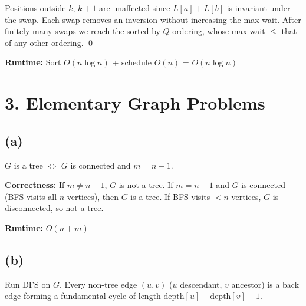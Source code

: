 \documentclass[11pt]{article}
\begin{document}
Positions outside $k$, $k{+}1$ are unaffected since $L[a] + L[b]$ is invariant under the swap. Each swap removes an inversion without increasing the max wait. After finitely many swaps we reach the sorted-by-$Q$ ordering, whose max wait $\le$ that of any other ordering. \qed

\textbf{Runtime:} Sort $O(n \log n)$ + schedule $O(n)$ = $\boxed{O(n \log n)}$

\newpage
\section*{3. Elementary Graph Problems}

\subsection*{(a)}

$G$ is a tree $\iff$ $G$ is connected and $m = n - 1$.

\begin{algorithm}[H]
\DontPrintSemicolon
{}
\end{algorithm}

\textbf{Correctness:} If $m \ne n - 1$, $G$ is not a tree. If $m = n - 1$ and $G$ is connected (BFS visits all $n$ vertices), then $G$ is a tree. If BFS visits $< n$ vertices, $G$ is disconnected, so not a tree.

\textbf{Runtime:} $\boxed{O(n + m)}$

\subsection*{(b)}

Run DFS on $G$. Every non-tree edge $(u, v)$ ($u$ descendant, $v$ ancestor) is a back edge forming a fundamental cycle of length $\text{depth}[u] - \text{depth}[v] + 1$.

\begin{algorithm}[H]
\DontPrintSemicolon
{}
\end{algorithm}
\end{document}
